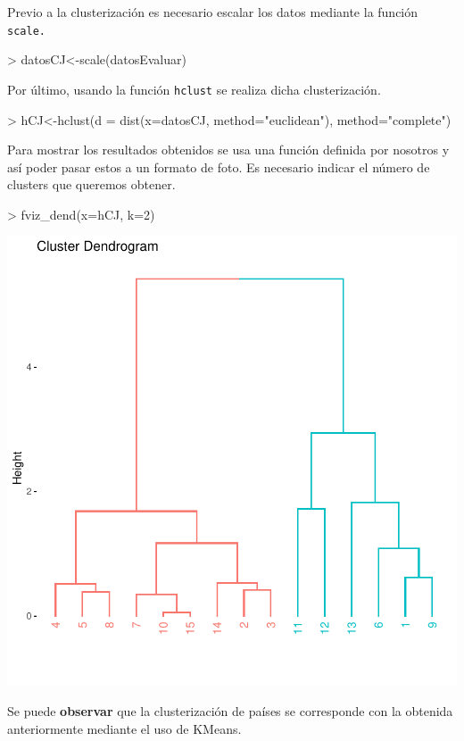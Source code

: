 \documentclass [a4paper] {article}
\begin{document}
\bigskip
Previo a la clusterización es necesario escalar los datos mediante la función \texttt{scale.}
\begin{Schunk}
\begin{Sinput}
> datosCJ<-scale(datosEvaluar)
\end{Sinput}
\end{Schunk}

\bigskip
Por último, usando la función \texttt{hclust} se realiza dicha clusterización.
\begin{Schunk}
\begin{Sinput}
> hCJ<-hclust(d = dist(x=datosCJ, method="euclidean"), method="complete")
\end{Sinput}
\end{Schunk}

\bigskip
Para mostrar los resultados obtenidos se usa una función definida por nosotros y así poder pasar estos
a un formato de foto. Es necesario indicar el número de clusters que queremos obtener.
\begin{center}
\begin{Schunk}
\begin{Sinput}
> fviz_dend(x=hCJ, k=2) 
\end{Sinput}
\end{Schunk}
\includegraphics{G16-p4-figura1}
\end{center}

\bigskip
Se puede \textbf{observar} que la clusterización de países se corresponde con la obtenida anteriormente mediante
el uso de KMeans.
\end{document}
